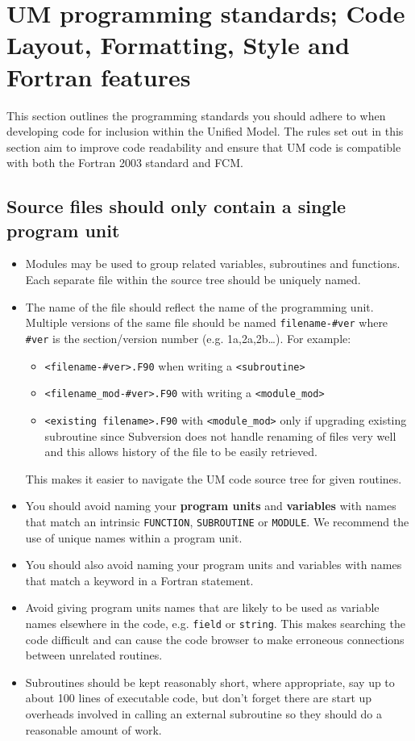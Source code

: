 \section{UM programming standards; Code Layout, Formatting, Style and Fortran features}
\label{sec:general}

This section outlines the programming standards you should adhere to when
developing code for inclusion within the Unified Model.
The rules set out in this section aim to improve code readability
and ensure that UM code is compatible with both the Fortran 2003 standard and FCM.

\subsection{Source files should only contain a single program unit}\label{sec:progunit}

\begin{itemize}
\item
Modules may be used to group related variables, subroutines and functions.
Each separate file within the source tree should be uniquely named.
\item The name of the file should reflect the name of the programming unit.
Multiple versions of the same file should be named
\verb|filename-#ver| where \verb|#ver|
is the section/version number (e.g. 1a,2a,2b\ldots). For example:
\begin{itemize}
\item \verb|<filename-#ver>.F90| when writing a \verb|<subroutine>|
\item \verb|<filename_mod-#ver>.F90| with writing a \verb|<module_mod>|
\item \verb|<existing filename>.F90| with \verb|<module_mod>| only if upgrading existing subroutine since Subversion does not handle renaming of files very well and this allows history of the file to be easily retrieved.
\end{itemize}
This makes it easier to navigate the UM code source tree for given routines.
\item You should avoid naming your {\bf program units} and
{\bf variables} with names that match an intrinsic \verb|FUNCTION|,
\verb|SUBROUTINE| or \verb|MODULE|.  We recommend the use of unique names within
a program unit.
\item You should also avoid naming your program units
and variables with names that match a keyword in a Fortran statement.
\item Avoid giving program units names that are likely to be used as variable
names elsewhere in the code, e.g. \verb|field| or \verb|string|. This makes
searching the code difficult and can cause the code browser to make
erroneous connections between unrelated routines.
\item Subroutines should be kept reasonably short, where appropriate,
say up to about 100 lines of executable code,
but don't forget there are start up overheads
involved in calling an external subroutine so
they should do a reasonable amount of work.

\end{itemize}

